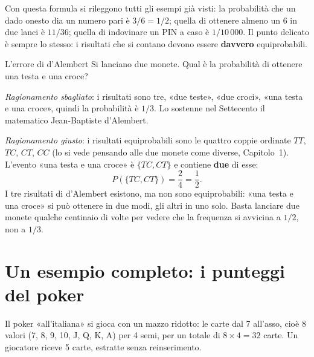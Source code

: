 Con questa formula si rileggono tutti gli esempi già visti: la probabilità che un dado onesto dia un numero pari è
$3/6 = 1/2$; quella di ottenere almeno un 6 in due lanci è $11/36$; quella di indovinare un PIN a caso è $1/10\,000$.
Il punto delicato è sempre lo stesso: i risultati che si contano devono essere \textbf{davvero} equiprobabili.

\begin{esempio}{L'errore di d'Alembert}
Si lanciano due monete. Qual è la probabilità di ottenere una testa e una croce?

\emph{Ragionamento sbagliato}: i risultati sono tre, «due teste», «due croci», «una testa e una croce», quindi la
probabilità è $1/3$. Lo sostenne nel Settecento il matematico Jean-Baptiste d'Alembert.

\emph{Ragionamento giusto}: i risultati equiprobabili sono le quattro coppie ordinate $TT$, $TC$, $CT$, $CC$ (lo si
vede pensando alle due monete come diverse, Capitolo~1). L'evento «una testa e una croce» è $\{TC, CT\}$ e contiene
\textbf{due} di esse:
\[ P(\{TC, CT\}) = \frac{2}{4} = \frac{1}{2} . \]
I tre risultati di d'Alembert esistono, ma non sono equiprobabili: «una testa e una croce» si può ottenere in due
modi, gli altri in uno solo. Basta lanciare due monete qualche centinaio di volte per vedere che la frequenza si
avvicina a $1/2$, non a $1/3$.
\end{esempio}

\section{Un esempio completo: i punteggi del poker}

Il poker «all'italiana» si gioca con un mazzo ridotto: le carte dal 7 all'asso, cioè 8 valori (7, 8, 9, 10, J, Q, K,
A) per 4 semi, per un totale di $8 \times 4 = 32$ carte. Un giocatore riceve 5 carte, estratte senza reinserimento.

